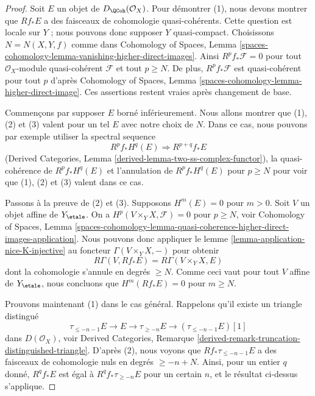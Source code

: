 \begin{proof}
Soit $E$ un objet de $D_\QCoh(\mathcal{O}_X)$.
Pour démontrer (1), nous devons montrer que $Rf_*E$ a des faisceaux
de cohomologie quasi-cohérents. Cette question est locale sur $Y$ ; nous pouvons
donc supposer $Y$ quasi-compact. Choisissons $N = N(X, Y, f)$ comme dans
Cohomology of Spaces, Lemma
\ref{spaces-cohomology-lemma-vanishing-higher-direct-images}.
Ainsi $R^pf_*\mathcal{F} = 0$ pour tout $\mathcal{O}_X$-module quasi-cohérent
$\mathcal{F}$ et tout $p \geq N$. De plus, $R^pf_*\mathcal{F}$
est quasi-cohérent pour tout $p$ d'après
Cohomology of Spaces, Lemma \ref{spaces-cohomology-lemma-higher-direct-image}.
Ces assertions restent vraies après changement de base.

\medskip\noindent
Commençons par supposer $E$ borné inférieurement. Nous allons montrer que (1), (2) et (3)
valent pour un tel $E$ avec notre choix de $N$. Dans ce cas, nous pouvons par exemple utiliser la
spectral sequence
$$
R^pf_*H^q(E) \Rightarrow R^{p + q}f_*E
$$
(Derived Categories, Lemma \ref{derived-lemma-two-ss-complex-functor}),
la quasi-cohérence de $R^pf_*H^q(E)$ et l'annulation de $R^pf_*H^q(E)$
pour $p \geq N$ pour voir que (1), (2) et (3) valent dans ce cas.

\medskip\noindent
Passons à la preuve de (2) et (3). Supposons $H^m(E) = 0$ pour $m > 0$.
Soit $V$ un objet affine de $Y_\etale$.
On a $H^p(V \times_Y X, \mathcal{F}) = 0$ pour $p \geq N$, voir
Cohomology of Spaces, Lemma
\ref{spaces-cohomology-lemma-quasi-coherence-higher-direct-images-application}.
Nous pouvons donc appliquer le lemme \ref{lemma-application-nice-K-injective}
au foncteur $\Gamma(V \times_Y X, -)$ pour obtenir
$$
R\Gamma(V, Rf_*E) = R\Gamma(V \times_Y X, E)
$$
dont la cohomologie s'annule en degrés $\geq N$. Comme ceci vaut pour
tout $V$ affine de $Y_\etale$, nous concluons que $H^m(Rf_*E) = 0$
pour $m \geq N$.

\medskip\noindent
Prouvons maintenant (1) dans le cas général. Rappelons qu'il existe un
triangle distingué
$$
\tau_{\leq -n - 1}E \to E \to \tau_{\geq -n}E \to
(\tau_{\leq -n - 1}E)[1]
$$
dans $D(\mathcal{O}_X)$, voir Derived Categories, Remarque
\ref{derived-remark-truncation-distinguished-triangle}.
D'après (2), nous voyons que $Rf_*\tau_{\leq -n - 1}E$
a des faisceaux de cohomologie nuls en degrés $\geq -n + N$.
Ainsi, pour un entier $q$ donné, $R^qf_*E$ est égal
à $R^qf_*\tau_{\geq -n}E$ pour un certain $n$, et le résultat
ci-dessus s'applique.
\end{proof}

